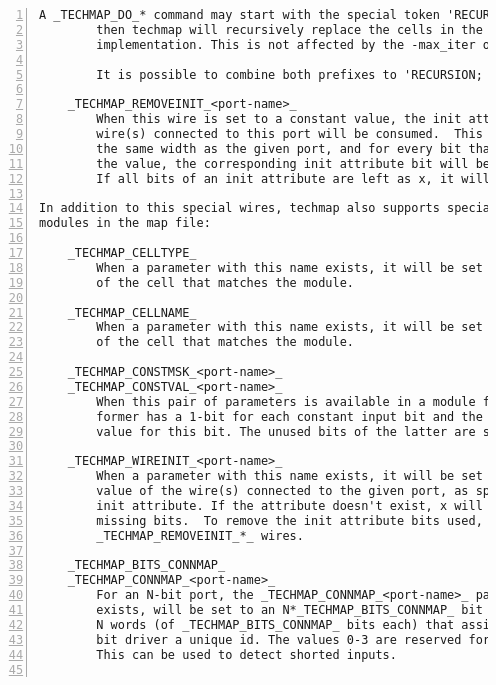 \begin{lstlisting}[numbers=left,frame=single]
        A _TECHMAP_DO_* command may start with the special token 'RECURSION; '.
        then techmap will recursively replace the cells in the module with their
        implementation. This is not affected by the -max_iter option.

        It is possible to combine both prefixes to 'RECURSION; CONSTMAP; '.

    _TECHMAP_REMOVEINIT_<port-name>_
        When this wire is set to a constant value, the init attribute of the
        wire(s) connected to this port will be consumed.  This wire must have
        the same width as the given port, and for every bit that is set to 1 in
        the value, the corresponding init attribute bit will be changed to 1'bx.
        If all bits of an init attribute are left as x, it will be removed.

In addition to this special wires, techmap also supports special parameters in
modules in the map file:

    _TECHMAP_CELLTYPE_
        When a parameter with this name exists, it will be set to the type name
        of the cell that matches the module.

    _TECHMAP_CELLNAME_
        When a parameter with this name exists, it will be set to the name
        of the cell that matches the module.

    _TECHMAP_CONSTMSK_<port-name>_
    _TECHMAP_CONSTVAL_<port-name>_
        When this pair of parameters is available in a module for a port, then
        former has a 1-bit for each constant input bit and the latter has the
        value for this bit. The unused bits of the latter are set to undef (x).

    _TECHMAP_WIREINIT_<port-name>_
        When a parameter with this name exists, it will be set to the initial
        value of the wire(s) connected to the given port, as specified by the
        init attribute. If the attribute doesn't exist, x will be filled for the
        missing bits.  To remove the init attribute bits used, use the
        _TECHMAP_REMOVEINIT_*_ wires.

    _TECHMAP_BITS_CONNMAP_
    _TECHMAP_CONNMAP_<port-name>_
        For an N-bit port, the _TECHMAP_CONNMAP_<port-name>_ parameter, if it
        exists, will be set to an N*_TECHMAP_BITS_CONNMAP_ bit vector containing
        N words (of _TECHMAP_BITS_CONNMAP_ bits each) that assign each single
        bit driver a unique id. The values 0-3 are reserved for 0, 1, x, and z.
        This can be used to detect shorted inputs.


\end{lstlisting}
